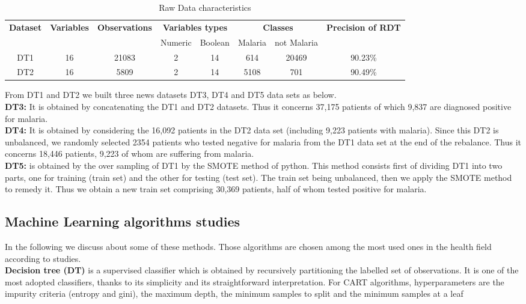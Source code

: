 \begin{table*}[h]
\centering
  \begin{tabular}{cccccccc}
    \toprule
    \multirow{2}{*}{\textbf{Dataset}} &
      \textbf{Variables}&\textbf{Observations}&
      \multicolumn{2}{c}{\textbf{Variables types}}& \multicolumn{2}{c}{\textbf{Classes}} & \textbf{Precision of RDT}\\
    & & & Numeric & Boolean & Malaria & not Malaria \\
    \midrule
    DT1 &16 & 21083  & 2 &  14& 614&20469 & 90.23\% \\
    DT2 & 16 & 5809 & 2 & 14 & 5108&701 & 90.49\% \\
    \bottomrule
  \end{tabular}
  \caption{Raw Data characteristics}\label{raw_data}
\end{table*}

From DT1 and DT2 we built three news datasets DT3, DT4 and DT5 data sets as below.\\
\textbf{DT3:}  It is obtained by concatenating the DT1 and DT2 datasets. Thus it concerns 37,175 patients of which 9,837 are diagnosed positive for malaria.\\
\textbf{DT4:} It is obtained by considering the 16,092 patients in the DT2 data set (including 9,223 patients with malaria). Since this DT2 is unbalanced, we randomly selected 2354 patients who tested negative for malaria from the DT1 data set at the end of the rebalance. Thus it concerns 18,446 patients, 9,223 of whom are suffering from malaria.\\
\textbf{DT5:} is obtained by the over sampling of DT1 by the SMOTE method of python. This method consists first of dividing DT1 into two parts, one for training (train set) and the other for testing (test set). The train set being unbalanced, then we apply the SMOTE method to remedy it. Thus we obtain a new train set comprising 30,369 patients, half of whom tested positive for malaria.
\subsection{Machine Learning algorithms studies}
In the following we discuss about some of these methods.  Those algorithms are chosen among the most used ones in the health field according to studies\cite{de2018binary,tomar2013survey}.\\
\textbf{Decision tree (DT)}\cite{Ro05} is a supervised classifier which is obtained by recursively partitioning the labelled set of observations. It is one of the most adopted classifiers, thanks to its simplicity and its straightforward interpretation. For CART algorithms, hyperparameters are the impurity criteria (entropy and gini), the maximum depth, the minimum samples to split and the minimum samples at a leaf

